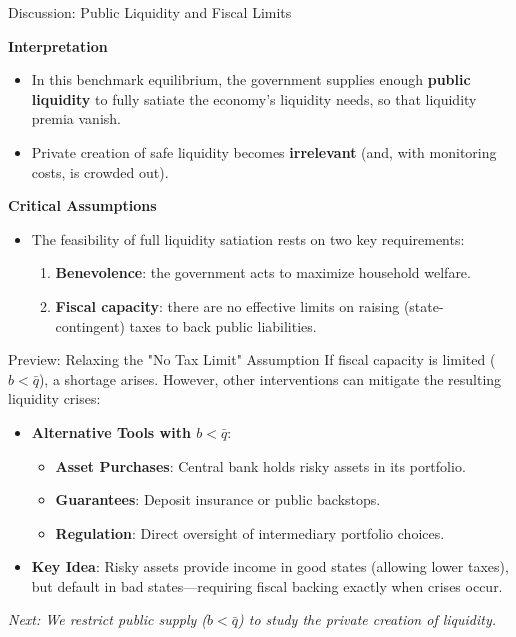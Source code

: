 \documentclass[11pt,aspectratio=169]{beamer}
\begin{document}
\begin{frame}{Discussion: Public Liquidity and Fiscal Limits}
\small

\textbf{Interpretation}
\begin{itemize}
  \item In this benchmark equilibrium, the government supplies enough \textbf{public liquidity} to fully satiate the economy’s liquidity needs, so that liquidity premia vanish.
  \item Private creation of safe liquidity becomes \textbf{irrelevant} (and, with monitoring costs, is crowded out).
\end{itemize}

\vspace{0.4cm}
\textbf{Critical Assumptions}
\begin{itemize}
  \item The feasibility of full liquidity satiation rests on two key requirements:
  \begin{enumerate}
    \item \textbf{Benevolence}: the government acts to maximize household welfare.
    \item \textbf{Fiscal capacity}: there are no effective limits on raising (state-contingent) taxes to back public liabilities.
  \end{enumerate}
\end{itemize}

\end{frame}

\begin{frame}{Preview: Relaxing the "No Tax Limit" Assumption}
\small
If fiscal capacity is limited ($b < \bar{q}$), a shortage arises. However, other interventions can mitigate the resulting liquidity crises:

\vspace{0.2cm}
\begin{itemize}
    \item \textbf{Alternative Tools with $b < \bar{q}$}:
    \begin{itemize}
        \item \textbf{Asset Purchases}: Central bank holds risky assets in its portfolio.
        \item \textbf{Guarantees}: Deposit insurance or public backstops.
        \item \textbf{Regulation}: Direct oversight of intermediary portfolio choices.
    \end{itemize}
    \vspace{0.4em}
    \item \textbf{Key Idea}: Risky assets provide income in good states (allowing lower taxes), but default in bad states—requiring fiscal backing exactly when crises occur.
\end{itemize}

\vspace{0.3cm}
\begin{center}
    \textit{Next: We restrict public supply ($b < \bar{q}$) to study the private creation of liquidity.}
\end{center}
\end{frame}
\end{document}
